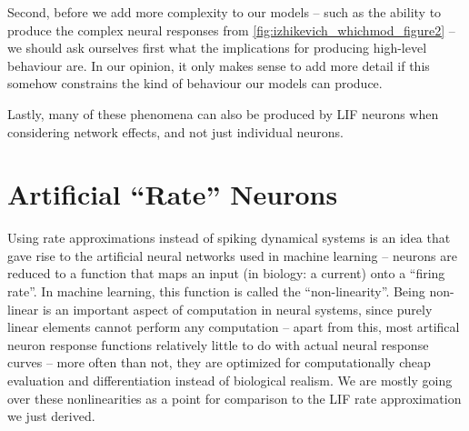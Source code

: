 \documentclass[10pt,letterpaper,oneside]{article}
\begin{document}
Second, before we add more complexity to our models -- such as the ability to produce the complex neural responses from \cref{fig:izhikevich_whichmod_figure2} -- we should ask ourselves first what the implications for producing high-level behaviour are. In our opinion, it only makes sense to add more detail if this somehow constrains the kind of behaviour our models can produce.

Lastly, many of these phenomena can also be produced by LIF neurons when considering network effects, and not just individual neurons.


\section{Artificial \enquote{Rate} Neurons}

Using rate approximations instead of spiking dynamical systems is an idea that gave rise to the artificial neural networks used in machine learning -- neurons are reduced to a function that maps an input (in biology: a current) onto a \enquote{firing rate}. In machine learning, this function is called the \enquote{non-linearity}. Being non-linear is an important aspect of computation in neural systems, since purely linear elements cannot perform any computation -- apart from this, most artifical neuron response functions relatively little to do with actual neural response curves --  more often than not, they are optimized for computationally cheap evaluation and differentiation instead of biological realism. We are mostly going over these nonlinearities as a point for comparison to the LIF rate approximation we just derived.

\end{document}

